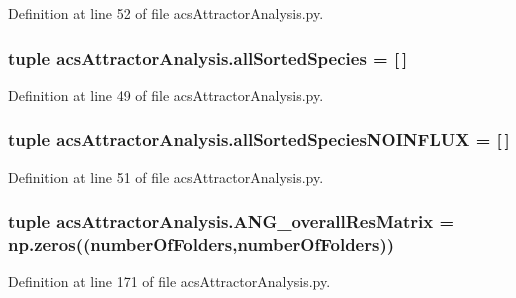 Definition at line 52 of file acs\-Attractor\-Analysis.\-py.

\hypertarget{a00096_aafc595063b7c4b74f94c0931ff2370a5}{
\subsubsection[{all\-Sorted\-Species}]{\setlength{\rightskip}{0pt plus 5cm}tuple acs\-Attractor\-Analysis.\-all\-Sorted\-Species = \mbox{[}$\,$\mbox{]}}}\label{a00096_aafc595063b7c4b74f94c0931ff2370a5}


Definition at line 49 of file acs\-Attractor\-Analysis.\-py.

\hypertarget{a00096_a02a8db664a67956bc698b79f7c31a7bd}{
\subsubsection[{all\-Sorted\-Species\-N\-O\-I\-N\-F\-L\-U\-X}]{\setlength{\rightskip}{0pt plus 5cm}tuple acs\-Attractor\-Analysis.\-all\-Sorted\-Species\-N\-O\-I\-N\-F\-L\-U\-X = \mbox{[}$\,$\mbox{]}}}\label{a00096_a02a8db664a67956bc698b79f7c31a7bd}


Definition at line 51 of file acs\-Attractor\-Analysis.\-py.

\hypertarget{a00096_a43a783e7bdb1094aa477c438bd67259f}{
\subsubsection[{A\-N\-G\-\_\-overall\-Res\-Matrix}]{\setlength{\rightskip}{0pt plus 5cm}tuple acs\-Attractor\-Analysis.\-A\-N\-G\-\_\-overall\-Res\-Matrix = np.\-zeros(({\bf number\-Of\-Folders},{\bf number\-Of\-Folders}))}}\label{a00096_a43a783e7bdb1094aa477c438bd67259f}


Definition at line 171 of file acs\-Attractor\-Analysis.\-py.

